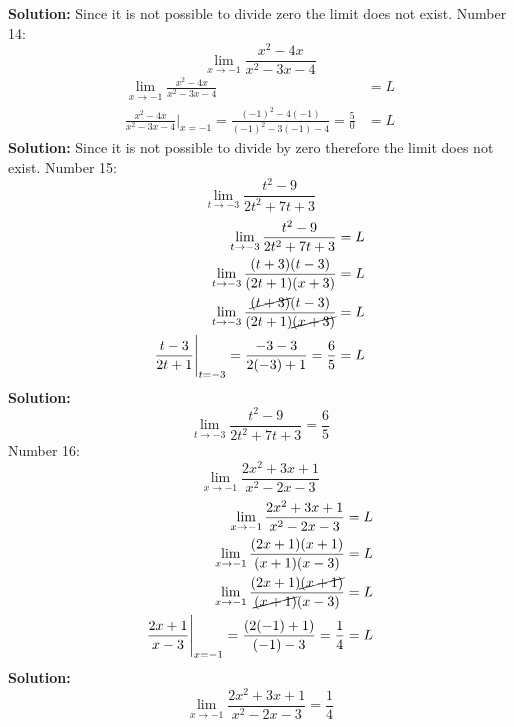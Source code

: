 \documentclass{article}
\begin{document}
	\textbf{Solution:}
	Since it is not possible to divide zero the limit does not exist.
	\newline
	\newline
	Number 14:
	\begin{equation*}
		\lim\limits_{x\to -1}{\frac{x^2-4x}{x^2-3x-4}}
	\end{equation*}
	\begin{eqnarray*}
		\lim\limits_{x\to -1}{\frac{x^2-4x}{x^2-3x-4}} &= L \\ \frac{x^2-4x}{x^2-3x-4}\Bigg\vert_{x=-1} = \frac{(-1)^2-4(-1)}{(-1)^2-3(-1)-4}=\frac50 &= L
	\end{eqnarray*}
	\textbf{Solution:}
	Since it is not possible to divide by zero therefore the limit does not exist.
	\newline
	\newline
	Number 15:
	\begin{equation*}
		\lim\limits_{t\to -3}{\frac{t^2-9}{2t^2+7t+3}}
	\end{equation*}
	\begin{eqnarray*}
		\lim\limits_{t\to -3}{\frac{t^2-9}{2t^2+7t+3}}&=L \\ \lim\limits_{t\to -3}{\frac{(t+3)(t-3)}{(2t+1)(x+3)}} &= L \\
		\lim\limits_{t\to -3}{\frac{\cancel{(t+3)}(t-3)}{(2t+1)\cancel{(x+3)}}} &= L \\
		\frac{t-3}{2t+1}\Bigg\vert_{t=-3} = \frac{-3-3}{2(-3)+1}=\frac{6}{5} &= L
	\end{eqnarray*}
	\textbf{Solution:}
	\begin{equation*}
		\lim\limits_{t\to -3}{\frac{t^2-9}{2t^2+7t+3}} = \frac65
	\end{equation*}
	Number 16:
	\begin{equation*}
		\lim\limits_{x\to -1}{\frac{2x^2+3x+1}{x^2-2x-3}}
	\end{equation*}
	\begin{eqnarray*}
		\lim\limits_{x\to -1}{\frac{2x^2+3x+1}{x^2-2x-3}} &= L \\
		\lim\limits_{x\to -1}{\frac{(2x+1)(x+1)}{(x+1)(x-3)}} &= L \\
		\lim\limits_{x\to -1}{\frac{(2x+1)\cancel{(x+1)}}{\cancel{(x+1)}(x-3)}} &= L \\
		\frac{2x+1}{x-3}\Bigg\vert_{x=-1} = \frac{(2(-1)+1)}{(-1)-3}= \frac14 &=L
	\end{eqnarray*}
	\textbf{Solution:}
	\begin{equation*}
		\lim\limits_{x\to -1}{\frac{2x^2+3x+1}{x^2-2x-3}}=\frac14
	\end{equation*}
\end{document}
